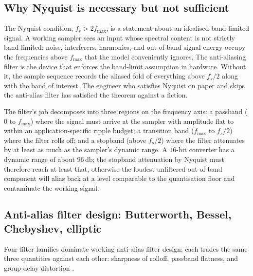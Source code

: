 \subsection{Why Nyquist is necessary but not sufficient}

The Nyquist condition, $f_{s} > 2 f_{\text{max}}$, is a statement
about an idealised band-limited signal. A working sampler sees an
input whose spectral content is not strictly band-limited: noise,
interferers, harmonics, and out-of-band signal energy occupy the
frequencies above $f_{\text{max}}$ that the model conveniently
ignores. The anti-aliasing filter is the device that enforces the
band-limit assumption in hardware. Without it, the sample sequence
records the aliased fold of everything above $f_{s}/2$ along with
the band of interest. The engineer who satisfies Nyquist on paper
and skips the anti-alias filter has satisfied the theorem against
a fiction.

The filter's job decomposes into three regions on the frequency
axis: a passband ($0$ to $f_{\text{max}}$) where the signal must
arrive at the sampler with amplitude flat to within an
application-specific ripple budget; a transition band
($f_{\text{max}}$ to $f_{s}/2$) where the filter rolls off; and a
stopband (above $f_{s}/2$) where the filter attenuates by at least
as much as the sampler's dynamic range. A $16$-bit converter has a
dynamic range of about $96 \,\si{\decibel}$; the stopband
attenuation by Nyquist must therefore reach at least that,
otherwise the loudest unfiltered out-of-band component will alias
back at a level comparable to the quantisation floor and
contaminate the working signal.

\subsection{Anti-alias filter design: Butterworth, Bessel, Chebyshev,
elliptic}

Four filter families dominate working anti-alias filter design;
each trades the same three quantities against each other:
sharpness of rolloff, passband flatness, and group-delay distortion
\cite{text:ch06t3-williams-electronic-filter-2006}.

